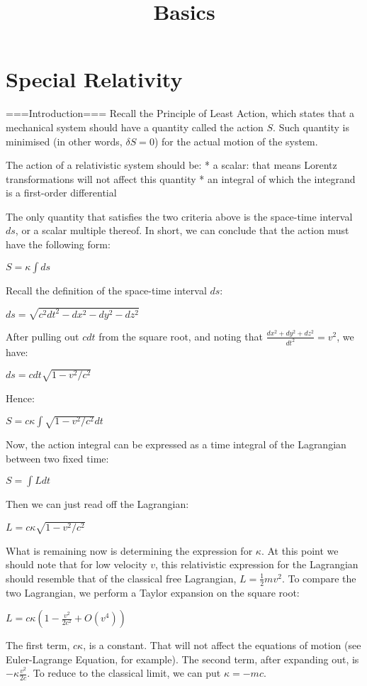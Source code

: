 \documentclass{article}
\title{Basics}
\date{}
\begin{document}
\maketitle

\section{Special Relativity}

===Introduction===
Recall the Principle of Least Action, which states that a mechanical system should have a quantity called the action $S$.  Such quantity is minimised (in other words, $\delta S = 0$) for the actual motion of the system.

The action of a relativistic system should be:
* a scalar: that means Lorentz transformations will not affect this quantity
* an integral of which the integrand is a first-order differential

The only quantity that satisfies the two criteria above is the space-time interval $ds$, or a scalar multiple thereof.  In short, we can conclude that the action must have the following form:

$S = \kappa\int ds$

Recall the definition of the space-time interval $ds$:

$ds = \sqrt{c^2 dt^2 - dx^2 - dy^2 - dz^2}$

After pulling out $cdt$ from the square root, and noting that $\frac{dx^2+dy^2+dz^2}{dt^2} = v^2$, we have:

$ds = cdt\sqrt{1 - v^2/c^2}$

Hence:

$S = c\kappa\int\sqrt{1-v^2/c^2}dt$

Now, the action integral can be expressed as a time integral of the Lagrangian between two fixed time:

$S = \int L dt$

Then we can just read off the Lagrangian: 

$L = c\kappa\sqrt{1-v^2/c^2}$

What is remaining now is determining the expression for $\kappa$.  At this point we should note that for low velocity $v$, this relativistic expression for the Lagrangian should resemble that of the classical free Lagrangian, $L = \frac{1}{2}mv^2$.  To compare the two Lagrangian, we perform a Taylor expansion on the square root:

$L = c\kappa\left(1-\frac{v^2}{2c^2}+O(v^4)\right)$

The first term, $c\kappa$, is a constant.  That will not affect the equations of motion (see Euler-Lagrange Equation, for example).  The second term, after expanding out, is $-\kappa\frac{v^2}{2c}$.  To reduce to the classical limit, we can put $\kappa=-mc$.
\end{document}
